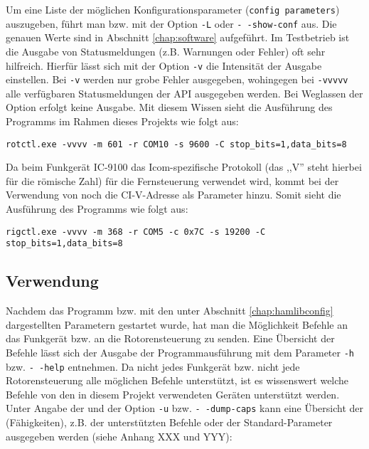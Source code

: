 Um eine Liste der möglichen Konfigurationsparameter (\texttt{config parameters}) auszugeben, führt man  bzw.  mit der Option \texttt{-L} oder \texttt{-\,-show-conf} aus. Die genauen Werte sind in Abschnitt \ref{chap:software} aufgeführt.\newpar
Im Testbetrieb ist die Ausgabe von Statusmeldungen (z.B. Warnungen oder Fehler) oft sehr hilfreich. Hierfür lässt sich mit der Option \texttt{-v} die Intensität der Ausgabe einstellen. Bei \texttt{-v} werden nur grobe Fehler ausgegeben, wohingegen bei \texttt{-vvvvv} alle verfügbaren Statusmeldungen der \ac{API} ausgegeben werden. Bei Weglassen der Option erfolgt keine Ausgabe. Mit diesem Wissen sieht die Ausführung des Programms  im Rahmen dieses Projekts wie folgt aus:

\vspace{-1em}
\begin{shaded}
	\texttt{rotctl.exe -vvvv -m 601 -r COM10 -s 9600 -C stop\_bits=1,data\_bits=8}
\end{shaded}
\vspace{-1em}

Da beim Funkgerät IC-9100 das Icom-spezifische Protokoll  (das ,,V'' steht hierbei für die römische Zahl) für die Fernsteuerung verwendet wird, kommt bei der Verwendung von  noch die CI-V-Adresse als Parameter hinzu. Somit sieht die Ausführung des Programms  wie folgt aus: 

\vspace{-1em}
\begin{shaded}
	\small{\texttt{rigctl.exe -vvvv -m 368 -r COM5 -c 0x7C -s 19200 -C stop\_bits=1,data\_bits=8}}
\end{shaded}

\subsection{Verwendung}
\label{chap:hamlibusage}

Nachdem das Programm  bzw.  mit den unter Abschnitt \ref{chap:hamlibconfig} dargestellten Parametern gestartet wurde, hat man die Möglichkeit Befehle an das Funkgerät bzw. an die Rotorensteuerung zu senden. Eine Übersicht der Befehle lässt sich der Ausgabe der Programmausführung mit dem Parameter \texttt{-h} bzw. \texttt{-\,-help} entnehmen.\newpar
Da nicht jedes Funkgerät bzw. nicht jede Rotorensteuerung alle möglichen Befehle unterstützt, ist es wissenswert welche Befehle von den in diesem Projekt verwendeten Geräten unterstützt werden. Unter Angabe der  und der Option \texttt{-u} bzw. \texttt{-\,-dump-caps} kann eine Übersicht der  (Fähigkeiten), z.B. der unterstützten Befehle oder der Standard-Parameter ausgegeben werden (siehe Anhang XXX und YYY):

